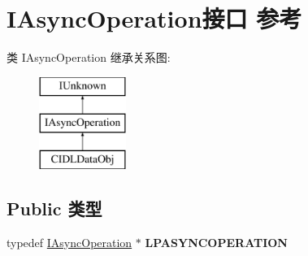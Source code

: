 \hypertarget{interface_i_async_operation}{}\section{I\+Async\+Operation接口 参考}
\label{interface_i_async_operation}
类 I\+Async\+Operation 继承关系图\+:\begin{figure}[H]
\begin{center}
\leavevmode
\includegraphics[height=3.000000cm]{interface_i_async_operation}
\end{center}
\end{figure}
\subsection*{Public 类型}
\begin{DoxyCompactItemize}
\item 
\mbox{\label{interface_i_async_operation_a0803896e50dadc91d0373fcf053bf7e0}} 
typedef \hyperlink{interface_i_async_operation}{I\+Async\+Operation} $\ast$ {\bfseries L\+P\+A\+S\+Y\+N\+C\+O\+P\+E\+R\+A\+T\+I\+ON}
\end{DoxyCompactItemize}
